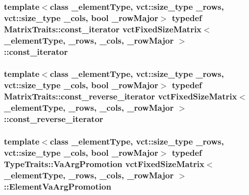 \subsubsection[{const\+\_\+iterator}]{\setlength{\rightskip}{0pt plus 5cm}template$<$class \+\_\+element\+Type, vct\+::size\+\_\+type \+\_\+rows, vct\+::size\+\_\+type \+\_\+cols, bool \+\_\+row\+Major$>$ typedef {\bf Matrix\+Traits\+::const\+\_\+iterator} {\bf vct\+Fixed\+Size\+Matrix}$<$ \+\_\+element\+Type, \+\_\+rows, \+\_\+cols, \+\_\+row\+Major $>$\+::{\bf const\+\_\+iterator}}\label{classvct_fixed_size_matrix_a6f5d0f13f38c1ccc8f736e6d0d5c8fb3}
\hypertarget{classvct_fixed_size_matrix_a0f130f24813be72cfe2c68af25f55c9a}{}
\subsubsection[{const\+\_\+reverse\+\_\+iterator}]{\setlength{\rightskip}{0pt plus 5cm}template$<$class \+\_\+element\+Type, vct\+::size\+\_\+type \+\_\+rows, vct\+::size\+\_\+type \+\_\+cols, bool \+\_\+row\+Major$>$ typedef {\bf Matrix\+Traits\+::const\+\_\+reverse\+\_\+iterator} {\bf vct\+Fixed\+Size\+Matrix}$<$ \+\_\+element\+Type, \+\_\+rows, \+\_\+cols, \+\_\+row\+Major $>$\+::{\bf const\+\_\+reverse\+\_\+iterator}}\label{classvct_fixed_size_matrix_a0f130f24813be72cfe2c68af25f55c9a}
\hypertarget{classvct_fixed_size_matrix_a68a3a606814298fd97f392dce89f9c7d}{}
\subsubsection[{Element\+Va\+Arg\+Promotion}]{\setlength{\rightskip}{0pt plus 5cm}template$<$class \+\_\+element\+Type, vct\+::size\+\_\+type \+\_\+rows, vct\+::size\+\_\+type \+\_\+cols, bool \+\_\+row\+Major$>$ typedef Type\+Traits\+::\+Va\+Arg\+Promotion {\bf vct\+Fixed\+Size\+Matrix}$<$ \+\_\+element\+Type, \+\_\+rows, \+\_\+cols, \+\_\+row\+Major $>$\+::{\bf Element\+Va\+Arg\+Promotion}}\label{classvct_fixed_size_matrix_a68a3a606814298fd97f392dce89f9c7d}
\hypertarget{classvct_fixed_size_matrix_a3512c7acacb6065a802898949cb78f43}{}
